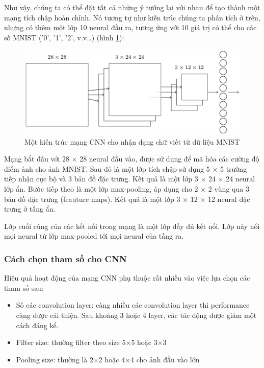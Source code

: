 Như vậy, chúng ta có thể đặt tất cả những ý tưởng lại với nhau để tạo thành một mạng tích chập hoàn chỉnh. Nó tương tự như kiến trúc chúng ta phân tích ở trên, nhưng có thêm một lớp 10 neural đầu ra, tương ứng với 10 giá trị có thể cho các số MNIST ('0', '1', '2', v.v…) (hình \ref{fig:cnnnhandangchuviet}):
\begin{figure}[H]
	\centering
	\includegraphics[width=1\linewidth]{images/cnnnhandangchuviet.png}
	\caption{Một kiến trúc mạng CNN cho nhận dạng chữ viết từ dữ liệu MNIST}
	\label{fig:cnnnhandangchuviet}
\end{figure}
Mạng bắt đầu với 28 × 28 neural đầu vào, được sử dụng để mã hóa các cường độ điểm ảnh cho ảnh MNIST. Sau đó là một lớp tích chập sử dụng 5 × 5 trường tiếp nhận cục bộ và 3 bản đồ đặc trưng. Kết quả là một lớp 3 × 24 × 24 neural lớp ẩn. Bước tiếp theo là một lớp max-pooling, áp dụng cho 2 × 2 vùng qua 3 bản đồ đặc trưng (feauture maps). Kết quả là một lớp 3 × 12 × 12 neural đặc trưng ở tầng ẩn.

Lớp cuối cùng của các kết nối trong mạng là một lớp đầy đủ kết nối. Lớp này nối mọi neural từ lớp max-pooled tới mọi neural của tầng ra.

\subsubsection{Cách chọn tham số cho CNN}
Hiệu quả hoạt động của mạng CNN phụ thuộc rất nhiều vào việc lựa chọn các tham số sau:

\begin{itemize}
	\item Số các convolution layer: càng nhiều các convolution layer thì performance càng được cải thiện. Sau khoảng 3 hoặc 4 layer, các tác động được giảm một cách đáng kể.
	\item Filter size: thường filter theo size 5×5 hoặc 3×3
	\item Pooling size: thường là 2×2 hoặc 4×4 cho ảnh đầu vào lớn
\end{itemize}


